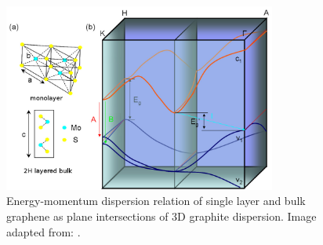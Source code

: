 \begin{figure}[htbp!] 
\centering  
\includegraphics[width=0.8\textwidth]{mos2_band.png}
\caption{Energy-momentum dispersion relation of single layer and bulk graphene as plane intersections of 3D graphite dispersion. Image adapted from: \cite{Mak2010b}. }  
\label{fig:mos2_band}
\end{figure} 

